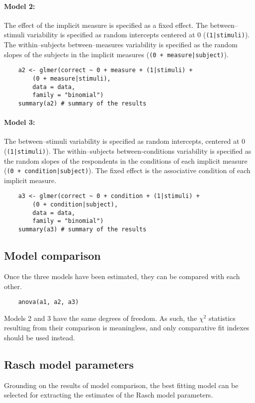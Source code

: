 \documentclass[12pt]{book}
\begin{document}
\paragraph*{Model 2:} The effect of the implicit measure is specified as a fixed effect.
The between--stimuli variability is specified as random intercepts centered at 0 (\texttt{(1|stimuli)}). 
The within--subjects between--measures variability is specified as the random slopes of the subjects in the implicit measures (\texttt{(0 + measure|subject)}).
%
\begin{lstlisting}
	a2 <- glmer(correct ~ 0 + measure + (1|stimuli) + 
		(0 + measure|stimuli), 
		data = data, 
		family = "binomial")
	summary(a2) # summary of the results  
\end{lstlisting}


\paragraph*{Model 3:}  
The between--stimuli variability is specified as random intercepts, centered at 0 (\texttt{(1|stimuli)}). 
The within--subjects between-conditions variability is specified as the random slopes of the respondents in the conditions of each implicit measure (\texttt{(0 + condition|subject)}).
The fixed effect is the associative condition of each implicit measure.
%
\begin{lstlisting}
	a3 <- glmer(correct ~ 0 + condition + (1|stimuli) + 
		(0 + condition|subject),
		data = data, 
		family = "binomial")
	summary(a3) # summary of the results  
\end{lstlisting}



\subsection{Model comparison}

Once the three models have been estimated, they can be compared with each other. 
%
\begin{lstlisting}
	anova(a1, a2, a3)
\end{lstlisting}

Models 2 and 3 have the same degrees of freedom. As such, the $\chi^2$ statistics resulting from their comparison is meaningless, and only comparative fit indexes should be used instead. 

\subsection{Rasch model parameters}
Grounding on the results of model comparison, the best fitting model can be selected for extracting the estimates of the Rasch model parameters. 
\end{document}
